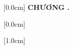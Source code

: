 \documentclass[a4paper,13pt,3p,twoside]{report}
\title{\bf \TITLE}
\author{\AUTHOR}
\theoremstyle{definition}
\begin{document}
	
	
	\newpage
	
	
	\newpage
	\renewcommand*\contentsname{MỤC LỤC}
	
	[0.0cm]             %
	{\bfseries\vspace{0.3cm}}                  %
	{{\bfseries{\scshape}
			CHƯƠNG \thecontentslabel.\ }}
	{}         %
	{\contentspage}         %
	
	
	[0.0cm]             %
	{\vspace{0.3cm}}                  %
	{\thecontentslabel \ } %
	{}         %
	{\contentspage}         %
	
	[1.0cm]             %
	{\vspace{0.3cm}}                  %
	{\thecontentslabel \ } %
	{}         %
	{\contentspage}         %
	
	\tableofcontents 
	\thispagestyle{empty}
	\cleardoublepage
	
	\renewcommand{\listfigurename}{DANH MỤC HÌNH VẼ}
	{\let\oldnumberline\numberline
		\renewcommand{\numberline}{Hình~\oldnumberline}
		\listoffigures} 
	\newpage
	
	
	\renewcommand{\listtablename}{DANH MỤC BẢNG BIỂU}
	{\let\oldnumberline\numberline
		\renewcommand{\numberline}{Bảng~\oldnumberline}
		\listoftables}
	
\end{document}
